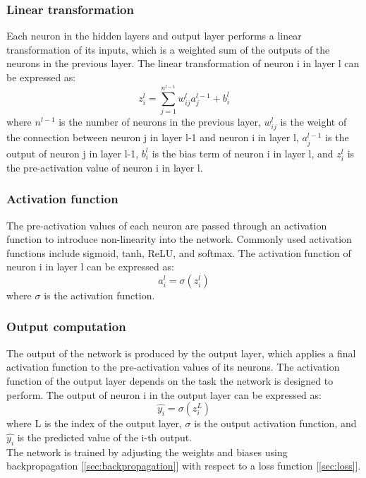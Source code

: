 \documentclass[a4paper]{sapthesis}
\begin{document}
\subsubsection{Linear transformation}
Each neuron in the hidden layers and output layer
 performs a linear transformation of its inputs, which is a weighted sum 
 of the outputs of the neurons in the previous layer. The linear 
 transformation of neuron i in layer l can be expressed as:
 \begin{equation}
  \label{eq:linear_transformation}
z_i^l = \sum_{j=1}^{n^{l-1}} w_{ij}^l a_j^{l-1} + b_i^l
\end{equation}
where $n^{l-1}$ is the number of neurons in the previous layer,
 $w_{ij}^l$ is the weight of the connection between neuron j in layer 
 l-1 and neuron i in layer l, $a_j^{l-1}$ is the output of neuron j 
 in layer l-1, $b_i^l$ is the bias term of neuron i in layer l, and
  $z_i^l$ is the pre-activation value of neuron i in layer l.
  \subsubsection{Activation function}
The pre-activation values of each neuron are 
passed through an activation function to introduce non-linearity
 into the network. Commonly used activation functions include sigmoid,
  tanh, ReLU, and softmax. The activation function of neuron i in layer
l can be expressed as:
\begin{equation}
\label{eq:activation_function}
a_i^l = \sigma(z_i^l)
\end{equation}
where $\sigma$ is the activation function.
\subsubsection{Output computation}
 The output of the network is produced by the output
 layer, which applies a final activation function to the pre-activation
  values of its neurons. The activation function of the output layer 
  depends on the task the network is designed to perform. The output of neuron i in the output layer can be expressed as:
\begin{equation}
\label{eq:output}
  \hat{y_i} = \sigma(z_i^L)
\end{equation}
where L is the index of the output layer, $\sigma$ is the output activation
 function, and $\hat{y_i}$ is the predicted value of the i-th output.\newline \\
The network is trained by adjusting the weights and biases using
backpropagation [\ref{sec:backpropagation}] with respect to a loss function
 [\ref{sec:loss}].
\end{document}
